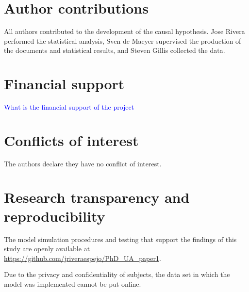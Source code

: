 \section{Author contributions}
All authors contributed to the development of the causal hypothesis. Jose Rivera performed the statistical analysis, Sven de Maeyer supervised the production of the documents and statistical results, and Steven Gillis collected the data.
%
%
\section{Financial support}
\textcolor{blue}{What is the financial support of the project}
%
%
\section{Conflicts of interest}
The authors declare they have no conflict of interest.
%
%
\section{Research transparency and reproducibility}
The model simulation procedures and testing that support the findings of this study are openly available at \url{https://github.com/jriveraespejo/PhD_UA_paper1}.

Due to the privacy and confidentiality of subjects, the data set in which the model was implemented cannot be put online.
%
%
